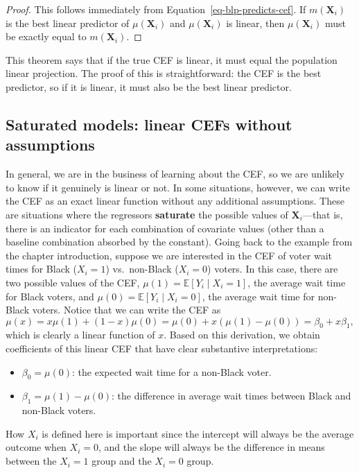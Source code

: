 \documentclass[
  13pt,
  letterpaper,
  DIV=11,
  numbers=noendperiod]{scrreprt}
\providecommand{\tightlist}{%
  \setlength{\itemsep}{0pt}\setlength{\parskip}{0pt}}
\newcommand{\mb}{\bm}
\newcommand{\E}{\mathbb{E}}
\newcommand{\X}{\mb{X}}
\theoremstyle{plain}
\theoremstyle{plain}
\theoremstyle{definition}
\theoremstyle{definition}
\theoremstyle{remark}
\begin{document}
\begin{proof}
This follows immediately from Equation~\ref{eq-blp-predicts-cef}. If
\(m(\X_i)\) is the best linear predictor of \(\mu(\X_i)\) and
\(\mu(\X_i)\) is linear, then \(\mu(\X_i)\) must be exactly equal to
\(m(\X_i)\).
\end{proof}

This theorem says that if the true CEF is linear, it must equal the
population linear projection. The proof of this is straightforward: the
CEF is the best predictor, so if it is linear, it must also be the best
linear predictor.

\subsection{Saturated models: linear CEFs without
assumptions}\label{saturated-models-linear-cefs-without-assumptions}

In general, we are in the business of learning about the CEF, so we are
unlikely to know if it genuinely is linear or not. In some situations,
however, we can write the CEF as an exact linear function without any
additional assumptions. These are situations where the regressors
\textbf{saturate} the possible values of \(\X_i\)---that is, there is an
indicator for each combination of covariate values (other than a
baseline combination absorbed by the constant). Going back to the
example from the chapter introduction, suppose we are interested in the
CEF of voter wait times for Black (\(X_i = 1\)) vs.~non-Black
(\(X_i = 0\)) voters. In this case, there are two possible values of the
CEF, \(\mu(1) = \E[Y_{i}\mid X_{i}= 1]\), the average wait time for
Black voters, and \(\mu(0) = \E[Y_{i}\mid X_{i} = 0]\), the average wait
time for non-Black voters. Notice that we can write the CEF as \[ 
\mu(x) = x \mu(1) + (1 - x) \mu(0) = \mu(0) + x\left(\mu(1) - \mu(0)\right)= \beta_0 + x\beta_1,
\] which is clearly a linear function of \(x\). Based on this
derivation, we obtain coefficients of this linear CEF that have clear
substantive interpretations:

\begin{itemize}
\tightlist
\item
  \(\beta_0 = \mu(0)\): the expected wait time for a non-Black voter.
\item
  \(\beta_1 = \mu(1) - \mu(0)\): the difference in average wait times
  between Black and non-Black voters.
\end{itemize}

How \(X_{i}\) is defined here is important since the intercept will
always be the average outcome when \(X_i = 0\), and the slope will
always be the difference in means between the \(X_i = 1\) group and the
\(X_i = 0\) group.
\end{document}
